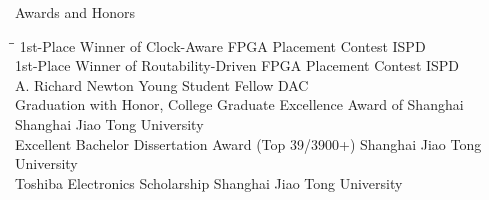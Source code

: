 
\begin{rSection}{Awards and Honors}
\begin{tabbing}
\hspace{4.55in}\= \hspace{1.95in}\= \kill
1st-Place Winner of Clock-Aware FPGA Placement Contest \> ISPD  \\
1st-Place Winner of Routability-Driven FPGA Placement Contest \> ISPD  \\
A. Richard Newton Young Student Fellow \> DAC  \\
Graduation with Honor, College Graduate Excellence Award of Shanghai \> Shanghai Jiao Tong University  \\
Excellent Bachelor Dissertation Award (Top 39/3900+) \> Shanghai Jiao Tong University  \\
Toshiba Electronics Scholarship \> Shanghai Jiao Tong University  \\

\end{tabbing}
\end{rSection}

